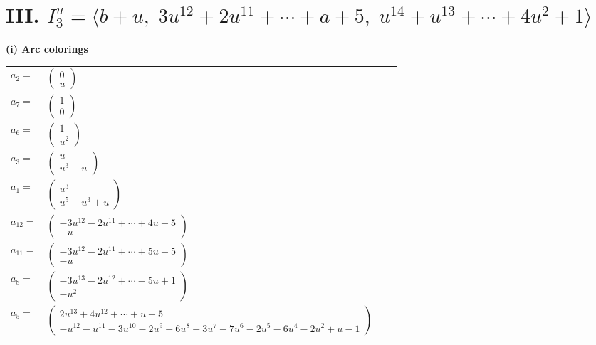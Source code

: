 \documentclass[1p]{elsarticle_modified}
\theoremstyle{definition}
\begin{document}
\centering \section*{III. $I^u_{3}= \langle b+u,\;3 u^{12}+2 u^{11}+\cdots+a+5,\;u^{14}+u^{13}+\cdots+4 u^2+1 \rangle$}
\flushleft \textbf{(i) Arc colorings}\\
\begin{tabular}{m{7pt} m{180pt} m{7pt} m{180pt} }
\flushright $a_{2}=$&$\begin{pmatrix}0\\u\end{pmatrix}$ \\
\flushright $a_{7}=$&$\begin{pmatrix}1\\0\end{pmatrix}$ \\
\flushright $a_{6}=$&$\begin{pmatrix}1\\u^2\end{pmatrix}$ \\
\flushright $a_{3}=$&$\begin{pmatrix}u\\u^3+u\end{pmatrix}$ \\
\flushright $a_{1}=$&$\begin{pmatrix}u^3\\u^5+u^3+u\end{pmatrix}$ \\
\flushright $a_{12}=$&$\begin{pmatrix}-3 u^{12}-2 u^{11}+\cdots+4 u-5\\- u\end{pmatrix}$ \\
\flushright $a_{11}=$&$\begin{pmatrix}-3 u^{12}-2 u^{11}+\cdots+5 u-5\\- u\end{pmatrix}$ \\
\flushright $a_{8}=$&$\begin{pmatrix}-3 u^{13}-2 u^{12}+\cdots-5 u+1\\- u^2\end{pmatrix}$ \\
\flushright $a_{5}=$&$\begin{pmatrix}2 u^{13}+4 u^{12}+\cdots+u+5\\- u^{12}- u^{11}-3 u^{10}-2 u^9-6 u^8-3 u^7-7 u^6-2 u^5-6 u^4-2 u^2+u-1\end{pmatrix}$ \\

\end{tabular}
\end{document}
